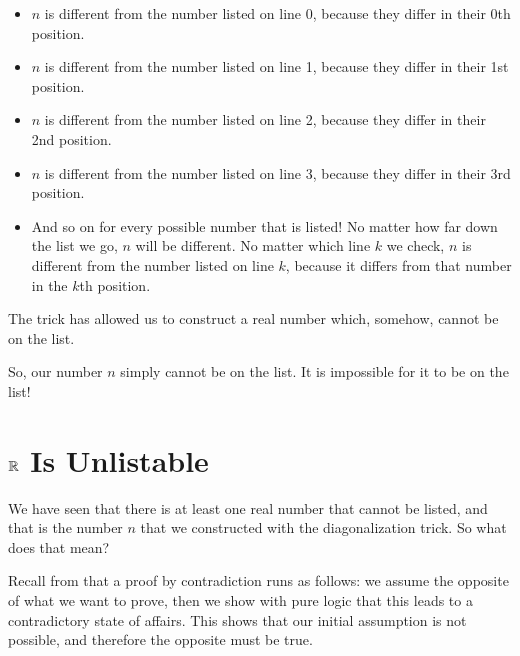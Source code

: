 \documentclass[../../../main.tex]{subfiles}
\begin{document}
\begin{itemize}

  \item $n$ is different from the number listed on line 0, because they differ in their 0th position.
  
  \item $n$ is different from the number listed on line 1, because they differ in their 1st position.
  
  \item $n$ is different from the number listed on line 2, because they differ in their 2nd position.
  
  \item $n$ is different from the number listed on line 3, because they differ in their 3rd position.
  
  \item And so on for every possible number that is listed! No matter how far down the list we go, $n$ will be different. No matter which line $k$ we check, $n$ is different from the number listed on line $k$, because it differs from that number in the $k$th position.

\end{itemize}

\begin{aside}
  \begin{remark}
    The  trick has allowed us to construct a real number which, somehow, cannot be on the list. 
  \end{remark}
\end{aside}

So, our number $n$ simply cannot be on the list. It is impossible for it to be on the list!


\section{$\Reals/$ Is Unlistable}

 We have seen that there is at least one real number that cannot be listed, and that is the number $n$ that we constructed with the diagonalization trick. So what does that mean?

\begin{aside}
  \begin{remark}
    Recall from  that a proof by contradiction runs as follows: we assume the opposite of what we want to prove, then we show with pure logic that this leads to a contradictory state of affairs. This shows that our initial assumption is not possible, and therefore the opposite must be true.
  \end{remark}
\end{aside}
\end{document}
